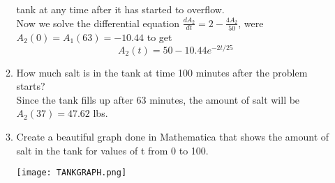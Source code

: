 \documentclass[10pt,a4paper]{article}
\begin{document}
\begin{enumerate}
\begin{enumerate}
tank at any time after it has started to overflow.\\
Now we solve the differential equation $\frac{dA_2}{dt}=2-\frac{4A_2}{50}$, were $A_2(0)=A_1(63)=-10.44$ to
get
\begin{equation}
A_2(t)=50-10.44e^{-2t/25}
\end{equation}
\item How much salt is in the tank at time 100 minutes after the problem starts? \\
Since the tank fills up after 63 minutes, the amount of salt will be $A_2(37)=47.62$ lbs.\\
\item Create a beautiful graph done in Mathematica that shows the amount of salt in the tank for values of t
from 0 to 100. \\
\begin{center}
\texttt{[image: TANKGRAPH.png]}
\end{center}
\end{enumerate}
\end{enumerate}
\end{document}

